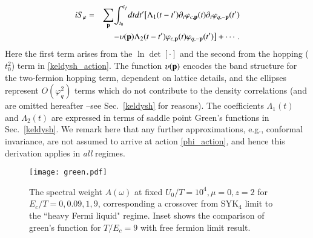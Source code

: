\documentclass[twocolumn,floatfix,superscriptaddress]{revtex4-1}
\begin{document}
\begin{eqnarray}
\label{phi_action}
iS_{\varphi}&=&\sum_{\bf p}\!\int_{t_0}^{t_f}\!dtdt' \big[\Lambda_1(t-t')\partial_t \varphi_{c,{\bf p}} (t)\partial_t \varphi_{q,-{\bf p}}(t')
\nonumber\\ && -\upsilon ({\bf p})\Lambda_2(t-t')\varphi_{c,{\bf p}}(t)\varphi_{q,-{\bf p}}(t')\big]+\cdots.
\end{eqnarray}
Here the first term arises from the $\ln \det [\cdot]$ and the second from the hopping ($t_0^2$) term in \eqref{keldysh_action}.  The function
$\upsilon ({\bf p})$ encodes the band structure for the two-fermion hopping term, dependent on lattice details, and the ellipses represent $O(\varphi_q^2)$ terms which do not contribute to the density correlations (and are omitted hereafter --see Sec.~\ref{keldysh} for reasons).  The coefficients $\Lambda_1(t)$ and $\Lambda_2(t)$ are expressed in terms of saddle point Green's functions in Sec.~\ref{keldysh}.   %
We remark here that any further approximations, e.g., conformal invariance, are not assumed to arrive at action \eqref{phi_action}, and hence this derivation applies in \emph{all} regimes.

 \begin{figure}[htbp]
 \begin{center}
 \texttt{[image: green.pdf]}
 \caption{ The spectral weight $A(\omega)$ at fixed $U_0/T=10^4,\mu=0,z=2$ for $E_c/T=0,0.09,1,9$, corresponding a crossover from SYK$_4$ limit to the ``heavy Fermi liquid" regime.  Inset shows the comparison of green's function for $T/E_c=9$ with free fermion limit result.%
 }    \label{green}
 \end{center}
 \end{figure}
 
\end{document}
